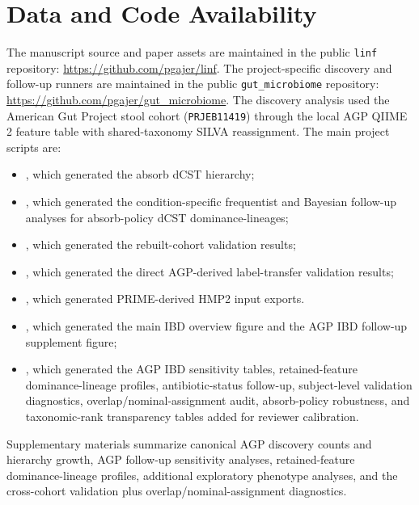 \documentclass[
  11pt,
]{article}
\providecommand{\tightlist}{%
  \setlength{\itemsep}{0pt}\setlength{\parskip}{0pt}}
\begin{document}
\section{Data and Code
Availability}\label{data-and-code-availability}

The manuscript source and paper assets are maintained in the public
\texttt{linf} repository: \url{https://github.com/pgajer/linf}. The
project-specific discovery and follow-up runners are maintained in the
public \texttt{gut\_microbiome} repository:
\url{https://github.com/pgajer/gut_microbiome}. The discovery analysis
used the American Gut Project stool cohort (\texttt{PRJEB11419}) through
the local AGP QIIME 2 feature table with shared-taxonomy SILVA
reassignment. The main project scripts
are:

\begin{itemize}
\tightlist
\item {}, which generated the absorb
dCST hierarchy;
\item {}, which generated the
condition-specific frequentist and Bayesian follow-up analyses for
absorb-policy dCST dominance-lineages;
\item {}, which
generated the rebuilt-cohort validation results;
\item {}, which
generated the direct AGP-derived label-transfer validation results;
\item {}, which
generated PRIME-derived HMP2 input exports.
\item {}, which generated the
main IBD overview figure and the AGP IBD follow-up supplement figure;
\item {}, which generated
the AGP IBD sensitivity tables, retained-feature dominance-lineage
profiles, antibiotic-status follow-up, subject-level validation
diagnostics, overlap/nominal-assignment audit, absorb-policy robustness,
and taxonomic-rank transparency tables added for reviewer calibration.
\end{itemize}

Supplementary materials summarize canonical AGP discovery counts and
hierarchy growth, AGP follow-up sensitivity analyses, retained-feature
dominance-lineage profiles, additional exploratory phenotype analyses,
and the cross-cohort validation plus overlap/nominal-assignment
diagnostics.
\end{document}
